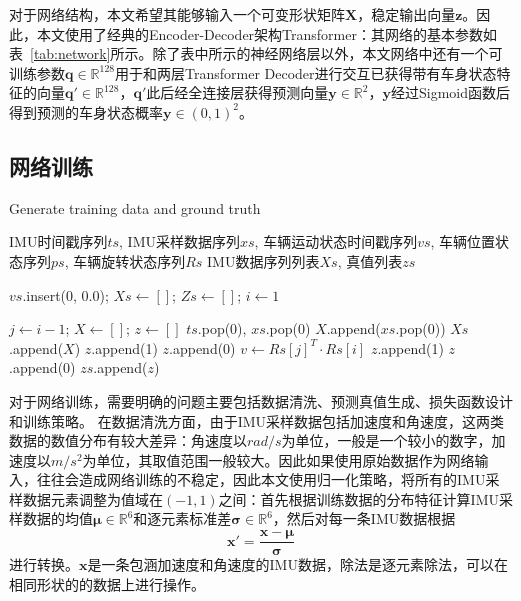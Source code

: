 对于网络结构，本文希望其能够输入一个可变形状矩阵$\symbf{X}$，稳定输出向量$\symbf{z}$。因此，本文使用了经典的Encoder-Decoder架构Transformer\cite{vaswani2017attention}：其网络的基本参数如表~\ref{tab:network}所示。除了表中所示的神经网络层以外，本文网络中还有一个可训练参数$\symbf{q} \in \mathbb{R}^{128}$用于和两层Transformer Decoder进行交互已获得带有车身状态特征的向量$\symbf{q}' \in \mathbb{R}^{128}$，$\symbf{q}'$此后经全连接层获得预测向量$\symbf{y} \in \mathbb{R}^2$，$\symbf{y}$经过Sigmoid函数后得到预测的车身状态概率$\symbf{y} \in (0, 1)^2$。

\subsection{网络训练}

\renewcommand{\algorithmicrequire}{\textbf{输入：}\unskip}
\renewcommand{\algorithmicensure}{\textbf{输出：}\unskip}
\begin{algorithm}
  \caption{Generate training data and ground truth}
  \label{alg1}
  \small
  \begin{algorithmic}[1]
    \REQUIRE IMU时间戳序列$ts$, IMU采样数据序列$xs$, 车辆运动状态时间戳序列$vs$, 车辆位置状态序列$ps$, 车辆旋转状态序列$Rs$
    \ENSURE IMU数据序列列表$Xs$, 真值列表$zs$

    \STATE $vs$.insert(0, 0.0); $Xs \leftarrow []$; $Zs \leftarrow []$; $i \leftarrow 1$

      \STATE $j \leftarrow i-1$; $X \leftarrow []$; $z \leftarrow []$
        \STATE $ts$.pop(0), $xs$.pop(0)
      \ENDWHILE
        \STATE $X$.append($xs$.pop(0))
      \ENDWHILE
      \STATE $Xs$.append($X$)
        \STATE $z$.append(1)
      \ELSE
        \STATE $z$.append(0)
      \ENDIF
      \STATE $v \leftarrow Rs[j]^T \cdot Rs[i]$
        \STATE $z$.append(1)
      \ELSE
        \STATE $z$.append(0)
      \ENDIF
      \STATE $zs$.append($z$)
    \ENDWHILE
  \end{algorithmic}
\end{algorithm}

对于网络训练，需要明确的问题主要包括数据清洗、预测真值生成、损失函数设计和训练策略。
在数据清洗方面，由于IMU采样数据包括加速度和角速度，这两类数据的数值分布有较大差异：角速度以$rad/s$为单位，一般是一个较小的数字，加速度以$m/s^2$为单位，其取值范围一般较大。因此如果使用原始数据作为网络输入，往往会造成网络训练的不稳定，因此本文使用归一化策略，将所有的IMU采样数据元素调整为值域在$(-1, 1)$之间：首先根据训练数据的分布特征计算IMU采样数据的均值$\symbf{\mu}\in \mathbb{R}^6$和逐元素标准差$\symbf{\sigma}\in \mathbb{R}^6$，然后对每一条IMU数据根据
\begin{equation}
  \symbf{x}' = \frac{\symbf{x} - \symbf{\mu}}{\symbf{\sigma}}
\end{equation}
进行转换。$\symbf{x}$是一条包涵加速度和角速度的IMU数据，除法是逐元素除法，可以在相同形状的的数据上进行操作。

